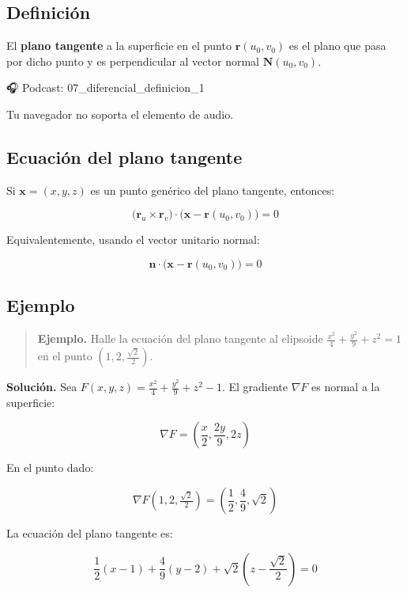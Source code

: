 \documentclass[
]{book}
\begin{document}
\subsection{Definición}\label{definiciuxf3n-7}

El \textbf{plano tangente} a la superficie en el punto \(\mathbf{r}(u_0, v_0)\) es el plano que pasa por dicho punto y es perpendicular al vector normal \(\mathbf{N}(u_0, v_0)\).

🎧 Podcast: 07\_diferencial\_definicion\_1

Tu navegador no soporta el elemento de audio.

\subsection{Ecuación del plano tangente}\label{ecuaciuxf3n-del-plano-tangente-1}

Si \(\mathbf{x} = (x, y, z)\) es un punto genérico del plano tangente, entonces:

\[
\bigl( \mathbf{r}_u \times \mathbf{r}_v \bigr) \cdot \bigl( \mathbf{x} - \mathbf{r}(u_0, v_0) \bigr) = 0
\]

Equivalentemente, usando el vector unitario normal:

\[
\mathbf{n} \cdot \bigl( \mathbf{x} - \mathbf{r}(u_0, v_0) \bigr) = 0
\]

\subsection{Ejemplo}\label{ejemplo-2}

\begin{quote}
\textbf{Ejemplo.} Halle la ecuación del plano tangente al elipsoide \(\frac{x^2}{4} + \frac{y^2}{9} + z^2 = 1\) en el punto \((1, 2, \frac{\sqrt{2}}{2})\).
\end{quote}

\textbf{Solución.} Sea \(F(x, y, z) = \frac{x^2}{4} + \frac{y^2}{9} + z^2 - 1\). El gradiente \(\nabla F\) es normal a la superficie:

\[
\nabla F = \left( \frac{x}{2}, \frac{2y}{9}, 2z \right)
\]

En el punto dado:

\[
\nabla F(1, 2, \tfrac{\sqrt{2}}{2}) = \left( \frac{1}{2}, \frac{4}{9}, \sqrt{2} \right)
\]

La ecuación del plano tangente es:

\[
\frac{1}{2}(x - 1) + \frac{4}{9}(y - 2) + \sqrt{2}\left(z - \frac{\sqrt{2}}{2}\right) = 0
\]
\end{document}
